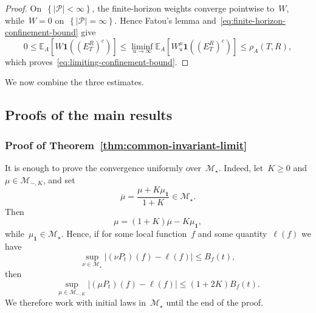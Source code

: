 \documentclass[EJP,preprint,NODS,nobera]{ejpecp}
\newcommand{\E}{\mathbb{E}}
\newcommand{\bb}[1]{\left(#1\right)}
\newcommand{\Cb}[1]{\left[#1\right]}
\newcommand{\cb}[1]{\left\{#1\right\}}
\newcommand{\abs}[1]{\left|#1\right|}
\newcommand{\ind}{\mathbf{1}}
\newcommand{\mb}[1]{\mathbf{#1}}
\begin{document}
\begin{proof}
On~$\cb{\abs{\mathcal P}<\infty}$, the finite-horizon weights converge
pointwise to~$W$, while~$W=0$ on~$\cb{\abs{\mathcal P}=\infty}$. Hence
Fatou's lemma and~\eqref{eq:finite-horizon-confinement-bound} give
\begin{equation*}
0
\leq
\E_A\Cb{W\ind\bb{(E_T^R)^c}}
\leq
\liminf_{u\to\infty}
\E_A\Cb{W_u^\mu\ind\bb{(E_T^R)^c}}
\leq
\rho_A(T,R),
\end{equation*}
which proves~\eqref{eq:limiting-confinement-bound}.
\end{proof}

We now combine the three estimates.


\subsection{Proofs of the main results}
\label{subsec:proofs-main}

\subsubsection{\texorpdfstring{Proof of Theorem~\ref{thm:common-invariant-limit}}{Proof of the main theorem}}
\label{subsec:proof-common-invariant-limit}

It is enough to prove the convergence uniformly over~$\mathcal M_\star$. Indeed, let~$K\geq0$ and
$\mu\in\mathcal M_{-,K}$, and set
\begin{equation*}
\overline\mu
=
\frac{\mu+K\mu_{\mb 1}}{1+K}
\in\mathcal M_\star.
\end{equation*}
Then
\begin{equation*}
\mu
=
(1+K)\overline\mu-K\mu_{\mb 1},
\end{equation*}
while~$\mu_{\mb 1}\in\mathcal M_\star$. Hence, if for some local
function~$f$ and some quantity~$\ell(f)$ we have
\begin{equation*}
\sup_{\nu\in\mathcal M_\star}
\abs{(\nu P_t)(f)-\ell(f)}
\leq
B_f(t),
\end{equation*}
then
\begin{equation}
\label{eq:m-minus-reduction}
\sup_{\mu\in\mathcal M_{-,K}}
\abs{(\mu P_t)(f)-\ell(f)}
\leq
(1+2K)B_f(t).
\end{equation}
We therefore work with initial laws in~$\mathcal M_\star$ until the end of
the proof.
\end{document}
